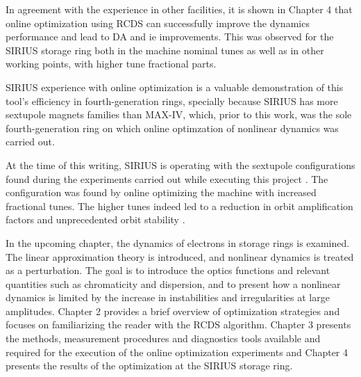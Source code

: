In agreement with the experience in other facilities, it is shown in Chapter 4 that online optimization using \gls*{RCDS} can successfully improve the dynamics performance and lead to \gls*{DA} and \gls*{ie} improvements. This was observed for the SIRIUS storage ring both in the machine nominal tunes as well as in other working points, with higher tune fractional parts.

SIRIUS experience with online optimization is a valuable demonstration of this tool's efficiency in fourth-generation rings, specially because SIRIUS has more sextupole magnets families than MAX-IV, which, prior to this work, was the sole fourth-generation ring on which online optimzation of nonlinear dynamics was carried out.

At the time of this writing, SIRIUS is operating with the sextupole configurations found during the experiments carried out while executing this project \cite{velloso_online_2023}. The configuration was found by online optimizing the machine with increased fractional tunes. The higher tunes indeed led to a reduction in orbit amplification factors and unprecedented orbit stability \cite{liu_status_2023}.

In the upcoming chapter, the dynamics of electrons in storage rings is examined. The linear approximation theory is introduced, and nonlinear dynamics is treated as a perturbation. The goal is to introduce the optics functions and relevant quantities such as chromaticity and dispersion, and to present how a nonlinear dynamics is limited by the increase in instabilities and irregularities at large amplitudes. Chapter 2 provides a brief overview of optimization strategies and focuses on familiarizing the reader with the \gls*{RCDS} algorithm. Chapter 3 presents the methods, measurement procedures and diagnostics tools available and required for the execution of the online optimization experiments and Chapter 4 presents the results of the optimization at the SIRIUS storage ring.
